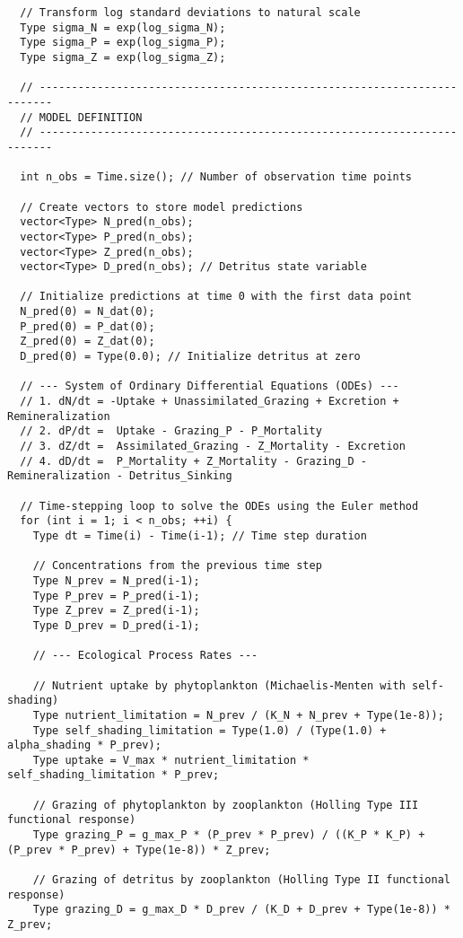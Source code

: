 \begin{lstlisting}
  // Transform log standard deviations to natural scale
  Type sigma_N = exp(log_sigma_N);
  Type sigma_P = exp(log_sigma_P);
  Type sigma_Z = exp(log_sigma_Z);

  // ------------------------------------------------------------------------
  // MODEL DEFINITION
  // ------------------------------------------------------------------------

  int n_obs = Time.size(); // Number of observation time points

  // Create vectors to store model predictions
  vector<Type> N_pred(n_obs);
  vector<Type> P_pred(n_obs);
  vector<Type> Z_pred(n_obs);
  vector<Type> D_pred(n_obs); // Detritus state variable

  // Initialize predictions at time 0 with the first data point
  N_pred(0) = N_dat(0);
  P_pred(0) = P_dat(0);
  Z_pred(0) = Z_dat(0);
  D_pred(0) = Type(0.0); // Initialize detritus at zero

  // --- System of Ordinary Differential Equations (ODEs) ---
  // 1. dN/dt = -Uptake + Unassimilated_Grazing + Excretion + Remineralization
  // 2. dP/dt =  Uptake - Grazing_P - P_Mortality
  // 3. dZ/dt =  Assimilated_Grazing - Z_Mortality - Excretion
  // 4. dD/dt =  P_Mortality + Z_Mortality - Grazing_D - Remineralization - Detritus_Sinking

  // Time-stepping loop to solve the ODEs using the Euler method
  for (int i = 1; i < n_obs; ++i) {
    Type dt = Time(i) - Time(i-1); // Time step duration

    // Concentrations from the previous time step
    Type N_prev = N_pred(i-1);
    Type P_prev = P_pred(i-1);
    Type Z_prev = Z_pred(i-1);
    Type D_prev = D_pred(i-1);

    // --- Ecological Process Rates ---
    
    // Nutrient uptake by phytoplankton (Michaelis-Menten with self-shading)
    Type nutrient_limitation = N_prev / (K_N + N_prev + Type(1e-8));
    Type self_shading_limitation = Type(1.0) / (Type(1.0) + alpha_shading * P_prev);
    Type uptake = V_max * nutrient_limitation * self_shading_limitation * P_prev;

    // Grazing of phytoplankton by zooplankton (Holling Type III functional response)
    Type grazing_P = g_max_P * (P_prev * P_prev) / ((K_P * K_P) + (P_prev * P_prev) + Type(1e-8)) * Z_prev;

    // Grazing of detritus by zooplankton (Holling Type II functional response)
    Type grazing_D = g_max_D * D_prev / (K_D + D_prev + Type(1e-8)) * Z_prev;


\end{lstlisting}
